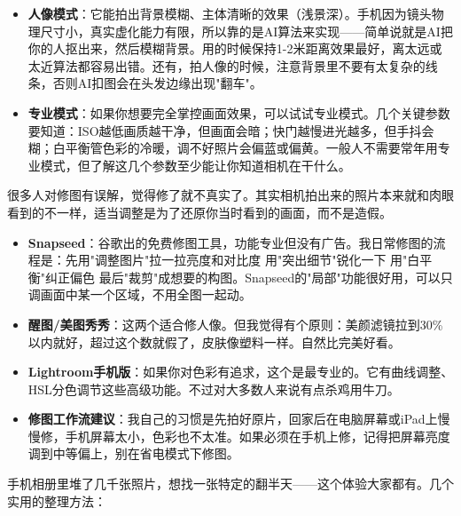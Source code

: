 
\begin{itemize}
  \item \textbf{人像模式}：它能拍出背景模糊、主体清晰的效果（浅景深）。手机因为镜头物理尺寸小，真实虚化能力有限，所以靠的是AI算法来实现——简单说就是AI把你的人抠出来，然后模糊背景。用的时候保持1-2米距离效果最好，离太远或太近算法都容易出错。还有，拍人像的时候，注意背景里不要有太复杂的线条，否则AI扣图会在头发边缘出现"翻车"。
  \item \textbf{专业模式}：如果你想要完全掌控画面效果，可以试试专业模式。几个关键参数要知道：ISO越低画质越干净，但画面会暗；快门越慢进光越多，但手抖会糊；白平衡管色彩的冷暖，调不好照片会偏蓝或偏黄。一般人不需要常年用专业模式，但了解这几个参数至少能让你知道相机在干什么。
\end{itemize}


很多人对修图有误解，觉得修了就不真实了。其实相机拍出来的照片本来就和肉眼看到的不一样，适当调整是为了还原你当时看到的画面，而不是造假。

\begin{itemize}
  \item \textbf{Snapseed}：谷歌出的免费修图工具，功能专业但没有广告。我日常修图的流程是：先用"调整图片"拉一拉亮度和对比度 用"突出细节"锐化一下 用"白平衡"纠正偏色 最后"裁剪"成想要的构图。Snapseed的"局部"功能很好用，可以只调画面中某一个区域，不用全图一起动。
  \item \textbf{醒图/美图秀秀}：这两个适合修人像。但我觉得有个原则：美颜滤镜拉到30\%以内就好，超过这个数就假了，皮肤像塑料一样。自然比完美好看。
  \item \textbf{Lightroom手机版}：如果你对色彩有追求，这个是最专业的。它有曲线调整、HSL分色调节这些高级功能。不过对大多数人来说有点杀鸡用牛刀。
  \item \textbf{修图工作流建议}：我自己的习惯是先拍好原片，回家后在电脑屏幕或iPad上慢慢修，手机屏幕太小，色彩也不太准。如果必须在手机上修，记得把屏幕亮度调到中等偏上，别在省电模式下修图。
\end{itemize}


手机相册里堆了几千张照片，想找一张特定的翻半天——这个体验大家都有。几个实用的整理方法：

